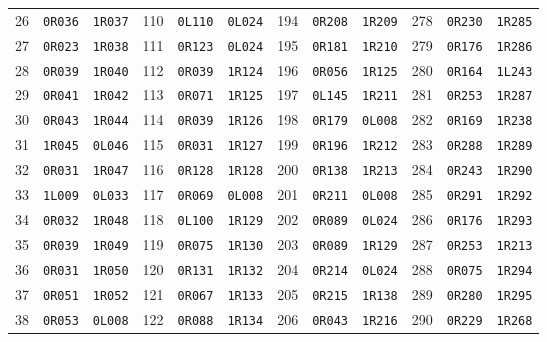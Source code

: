 \begin{longtable}{rll@{\qquad}rll@{\qquad}rll@{\qquad}rll}
26 & \texttt{0R036} & \texttt{1R037} & 110 & \texttt{0L110} & \texttt{0L024} & 194 & \texttt{0R208} & \texttt{1R209} & 278 & \texttt{0R230} & \texttt{1R285} \\
27 & \texttt{0R023} & \texttt{1R038} & 111 & \texttt{0R123} & \texttt{0L024} & 195 & \texttt{0R181} & \texttt{1R210} & 279 & \texttt{0R176} & \texttt{1R286} \\
28 & \texttt{0R039} & \texttt{1R040} & 112 & \texttt{0R039} & \texttt{1R124} & 196 & \texttt{0R056} & \texttt{1R125} & 280 & \texttt{0R164} & \texttt{1L243} \\
29 & \texttt{0R041} & \texttt{1R042} & 113 & \texttt{0R071} & \texttt{1R125} & 197 & \texttt{0L145} & \texttt{1R211} & 281 & \texttt{0R253} & \texttt{1R287} \\
30 & \texttt{0R043} & \texttt{1R044} & 114 & \texttt{0R039} & \texttt{1R126} & 198 & \texttt{0R179} & \texttt{0L008} & 282 & \texttt{0R169} & \texttt{1R238} \\
31 & \texttt{1R045} & \texttt{0L046} & 115 & \texttt{0R031} & \texttt{1R127} & 199 & \texttt{0R196} & \texttt{1R212} & 283 & \texttt{0R288} & \texttt{1R289} \\
32 & \texttt{0R031} & \texttt{1R047} & 116 & \texttt{0R128} & \texttt{1R128} & 200 & \texttt{0R138} & \texttt{1R213} & 284 & \texttt{0R243} & \texttt{1R290} \\
33 & \texttt{1L009} & \texttt{0L033} & 117 & \texttt{0R069} & \texttt{0L008} & 201 & \texttt{0R211} & \texttt{0L008} & 285 & \texttt{0R291} & \texttt{1R292} \\
34 & \texttt{0R032} & \texttt{1R048} & 118 & \texttt{0L100} & \texttt{1R129} & 202 & \texttt{0R089} & \texttt{0L024} & 286 & \texttt{0R176} & \texttt{1R293} \\
35 & \texttt{0R039} & \texttt{1R049} & 119 & \texttt{0R075} & \texttt{1R130} & 203 & \texttt{0R089} & \texttt{1R129} & 287 & \texttt{0R253} & \texttt{1R213} \\
36 & \texttt{0R031} & \texttt{1R050} & 120 & \texttt{0R131} & \texttt{1R132} & 204 & \texttt{0R214} & \texttt{0L024} & 288 & \texttt{0R075} & \texttt{1R294} \\
37 & \texttt{0R051} & \texttt{1R052} & 121 & \texttt{0R067} & \texttt{1R133} & 205 & \texttt{0R215} & \texttt{1R138} & 289 & \texttt{0R280} & \texttt{1R295} \\
38 & \texttt{0R053} & \texttt{0L008} & 122 & \texttt{0R088} & \texttt{1R134} & 206 & \texttt{0R043} & \texttt{1R216} & 290 & \texttt{0R229} & \texttt{1R268} \\

\end{longtable}
